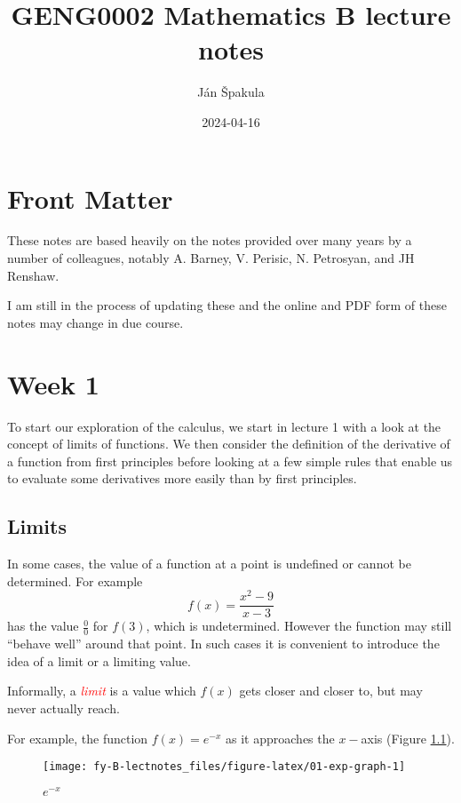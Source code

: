 \documentclass[
  11pt,
  oneside]{book}
\title{GENG0002 Mathematics B lecture notes}
\author{Ján Špakula}
\date{2024-04-16}
\newcommand{\slide}{}
\theoremstyle{definition}
\theoremstyle{definition}
\theoremstyle{definition}
\theoremstyle{definition}
\theoremstyle{remark}
\begin{document}
\maketitle

{
\setcounter{tocdepth}{1}
\tableofcontents
}
\chapter*{Front Matter}\label{front-matter}

These notes are based heavily on the notes provided over many years by a number of colleagues, notably A. Barney, V. Perisic, N. Petrosyan, and JH Renshaw.

I am still in the process of updating these and the online and PDF form of these notes may change in due course.

\chapter{Week 1}\label{week-one}

To start our exploration of the calculus, we start in lecture 1 with a look at the concept of limits of functions. We then consider the definition of the derivative of a function from first principles before looking at a few simple rules that enable us to evaluate some derivatives more easily than by first principles.
\slide

\section{Limits}\label{lecture-one}

In some cases, the value of a function at a point is undefined or cannot be determined. For example
\[
f(x) = \frac{x^2-9}{x-3}\tag{1}
\]
has the value \(\frac00\) for \(f(3)\), which is undetermined. However the function may still ``behave well'' around that point. In such cases it is convenient to introduce the idea of a limit or a limiting value.

Informally, a \textcolor{red}{\em limit} is a value which \(f(x)\) gets closer and closer to, but may never actually reach.

\slide

For example, the function \(f(x) = e^{-x}\) as it approaches the \(x-\)axis (Figure \ref{fig:01-exp-graph}).

\begin{figure}

{\centering \texttt{[image: fy-B-lectnotes\_files/figure-latex/01-exp-graph-1]} 

}

\caption{$e^{-x}$}\label{fig:01-exp-graph}
\end{figure}
\end{document}
